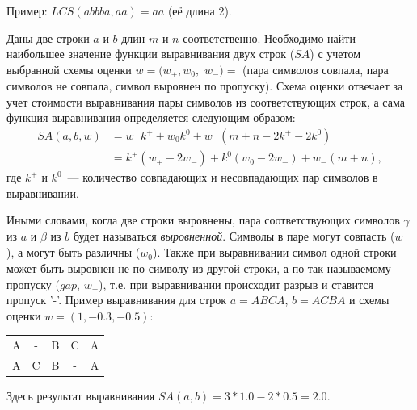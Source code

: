 Пример: \hspace{1cm}
    $LCS(abbba,aa)=aa$ (её длина 2).
 
\begin{definition}
Даны две строки $a$ и $b$ длин $m$ и $n$ соответственно.
Необходимо найти наибольшее  значение функции выравнивания двух строк ($SA$) с учетом выбранной схемы оценки $w = (w_{+}, w_{0} ,$ $w_{-})=$ (пара символов совпала, пара символов не совпала, символ выровнен по пропуску).
Схема оценки отвечает за учет стоимости выравнивания пары символов из соответствующих строк, а сама функция выравнивания определяется следующим образом:
\begin{equation}\label{formula:sa}
\begin{array}{ll}
  SA(a,b,w) &= w_{+}k^{+} + w_{0}k^{0} + w_{-} (m + n - 2k^{+} - 2k^{0}) \\
  &= k^{+} (w_{+} - 2w_{-} ) + k^{0}  (w_{0} - 2w_{-}) + w_{-}(m + n),
\end{array}
\end{equation}
где $k^{+}$ и $k^{0}$~--- количество совпадающих и несовпадающих пар символов в выравнивании.
\end{definition}

Иными словами, когда две строки выровнены, пара соответствующих символов $\gamma$ из $a$ и $\beta$ из $b$ будет называться \emph{выровненной}.
Символы в паре могут совпасть ($w_{+}$), а могут быть различны ($w_{0}$).
Также при выравнивании символ одной строки может  быть выровнен не по символу из другой строки, а по так называемому пропуску ($gap$, $w_{-}$), т.е. при выравнивании происходит разрыв и ставится пропуск '-'.
Пример выравнивания для строк $a=ABCA$, $b=ACBA$ и схемы оценки $w = (1, -0.3, -0.5)$:
\begin{center}
    \begin{tabular}{ccccc}
    A & - & B &  C  &  A \\
    A & C & B &  - &  A
    \end{tabular}
\end{center}
Здесь результат выравнивания $SA(a,b) = 3*1.0-2*0.5 = 2.0$.

